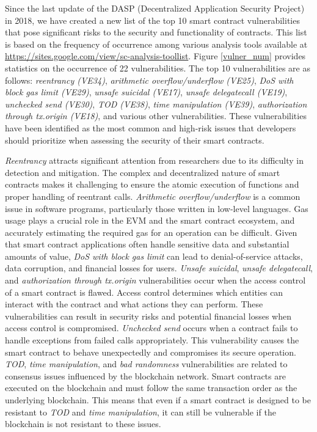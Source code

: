 \documentclass[manuscript,screen]{acmart}
\begin{document}
Since the last update of the DASP (Decentralized Application Security Project) in 2018, we have created a new list of the top 10 smart contract vulnerabilities that pose significant risks to the security and functionality of contracts. This list is based on the frequency of occurrence among various analysis tools available at \url{https://sites.google.com/view/sc-analysis-toollist}. Figure \ref{vulner_num} provides statistics on the occurrence of 22 vulnerabilities. The top 10 vulnerabilities are as follows:
    \textit{reentrancy (VE34)}, 
    \textit{arithmetic overflow/underflow (VE25)}, 
    \textit{DoS with block gas limit (VE29)}, 
    \textit{unsafe suicidal (VE17)}, 
    \textit{unsafe delegatecall (VE19)}, 
    \textit{unchecked send (VE30)}, 
    \textit{TOD (VE38)}, 
    \textit{time manipulation (VE39)}, 
    \textit{authorization through tx.origin (VE18)}, 
    and various other vulnerabilities. 
These vulnerabilities have been identified as the most common and high-risk issues that developers should prioritize when assessing the security of their smart contracts.

\textit{Reentrancy} attracts significant attention from researchers due to its difficulty in detection and mitigation. The complex and decentralized nature of smart contracts makes it challenging to ensure the atomic execution of functions and proper handling of reentrant calls. 
\textit{Arithmetic overflow/underflow} is a common issue in software programs, particularly those written in low-level languages. 
Gas usage plays a crucial role in the EVM and the smart contract ecosystem, and accurately estimating the required gas for an operation can be difficult. Given that smart contract applications often handle sensitive data and substantial amounts of value, \textit{DoS with block gas limit} can lead to denial-of-service attacks, data corruption, and financial losses for users. 
\textit{Unsafe suicidal}, \textit{unsafe delegatecall}, and \textit{authorization through tx.origin} vulnerabilities occur when the access control of a smart contract is flawed. Access control determines which entities can interact with the contract and what actions they can perform. These vulnerabilities can result in security risks and potential financial losses when access control is compromised. 
\textit{Unchecked send} occurs when a contract fails to handle exceptions from failed calls appropriately. This vulnerability causes the smart contract to behave unexpectedly and compromises its secure operation. 
\textit{TOD}, \textit{time manipulation}, and \textit{bad randomness} vulnerabilities are related to consensus issues influenced by the blockchain network. Smart contracts are executed on the blockchain and must follow the same transaction order as the underlying blockchain. This means that even if a smart contract is designed to be resistant to \textit{TOD} and \textit{time manipulation}, it can still be vulnerable if the blockchain is not resistant to these issues.
\end{document}
